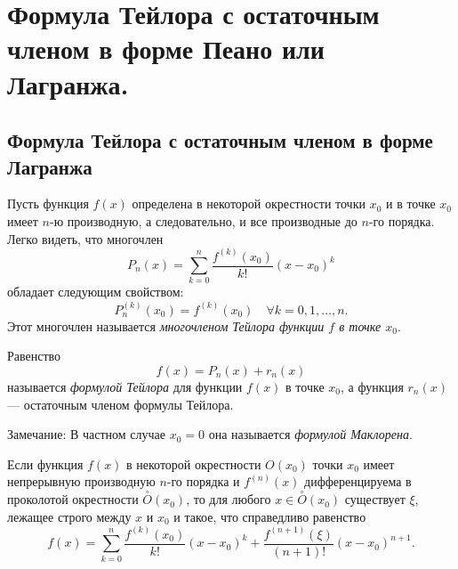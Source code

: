 \chapter{Формула Тейлора с остаточным членом в форме Пеано или Лагранжа.}
\section{Формула Тейлора с остаточным членом в форме Лагранжа}

Пусть функция $f(x)$ определена в некоторой окрестности точки $x_0$ и в точке $x_0$ имеет $n$-ю производную, а следовательно, и все производные до $n$-го порядка. Легко видеть, что многочлен
$$
P_n(x) = \sum_{k = 0}^{n} \frac{f^{(k)}(x_0)}{k!} (x - x_0)^k
$$
обладает следующим свойством:
$$
P_n^{(k)}(x_0) = f^{(k)}(x_0) \quad \forall k = 0,1,\ldots,n.
$$
Этот многочлен называется \textit{многочленом Тейлора функции $f$ в точке $x_0$}.

Равенство $$f(x) = P_n(x) + r_n(x)$$ называется \textit{формулой Тейлора} для функции $f(x)$ в точке $x_0$, а функция $r_n(x)$ --- остаточным членом формулы Тейлора.

Замечание: В частном случае $x_0=0$ она называется \textit{формулой Маклорена}.

\begin{thm}
Если функция $f(x)$ в некоторой окрестности $O(x_0)$ точки $x_0$ имеет непрерывную производную $n$-го порядка и $f^{(n)}(x)$ дифференцируема в проколотой окрестности $\overset{\circ}{O}(x_0)$, то для любого
$x \in \overset{\circ}{O}(x_0)$ существует $\xi$, лежащее строго между $x$ и $x_0$ и такое, что справедливо равенство
\begin{equation} \label{ch5.1eq1}
f(x) = \sum_{k = 0}^{n} \frac{f^{(k)}(x_0)}{k!}(x - x_0)^k + \frac{f^{(n + 1)}(\xi)}{(n + 1)!}(x - x_0)^{n + 1}.
\end{equation}
\end{thm}


